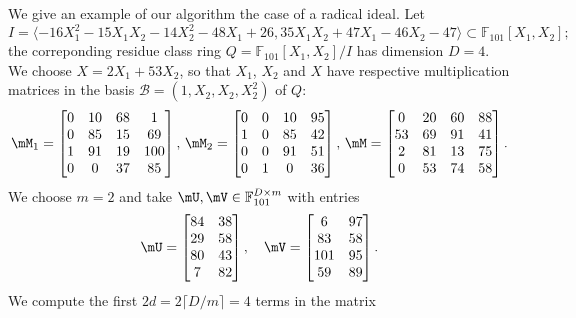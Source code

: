 \documentclass[12pt]{article}
\newcommand{\basis}{\mathscr{B}}
\newcommand{\lf}{X}
\def\F {\ensuremath{\mathbb{F}}}
\begin{document}
We give an example of our algorithm  the case of a radical ideal. Let
$$I = \langle -16X_1^2 - 15X_1X_2 - 14X_2^2 - 48X_1 + 26, 35X_1X_2 + 47X_1 - 46X_2 - 47 \rangle \subset \F_{101}[X_1,X_2];$$
the correponding residue class ring $Q=\F_{101}[X_1,X_2]/I$ has dimension $D=4$.
We choose $\lf = 2X_1 + 53 X_2$, so that $X_1$, $X_2$ and $\lf$ have respective multiplication matrices
in the basis $\basis=(1,X_2,X_2,X_2^2)$ of $Q$:
\begin{align*}
\mM_1 = \begin{bmatrix}
  0 & 10 & 68&   1\\
  0 & 85 & 15&  69\\
  1 & 91 & 19& 100\\
  0 &  0 & 37&  85
\end{bmatrix},\,
\mM_2 = \begin{bmatrix}
  0 &  0 & 10 & 95\\
  1 &  0 & 85 & 42\\
  0 &  0 & 91 & 51\\
  0 &  1 &  0 & 36
\end{bmatrix},\,
\mM = \begin{bmatrix}
 0 & 20&  60&  88\\
53 & 69&  91&  41\\
 2 & 81&  13&  75\\
 0 & 53&  74&  58
\end{bmatrix}.
\end{align*}
We choose $m = 2$ and take $\mU,\mV \in \F_{101}^{D\times m}$ with 
entries
$$ \mU = \begin{bmatrix}
84& 38\\
29& 58\\
80& 43\\
 7& 82
\end{bmatrix},\quad
\mV = \begin{bmatrix}
  6&  97\\
 83&  58\\
101&  95\\
 59&  89
\end{bmatrix}.
$$ We compute the first $2d=2\lceil D/m\rceil =4$ terms in the matrix
\end{document}

